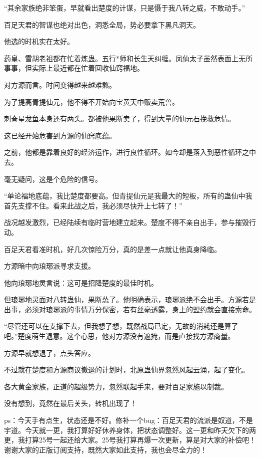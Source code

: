 \begin{this_body}
“其余家族绝非笨蛋，早就看出楚度的计谋，只是慑于我八转之威，不敢动手。”

百足天君的智谋也绝对出色，洞悉全局，势必要拿下黑凡洞天。

他选的时机实在太好。

药皇、雪胡老祖都在忙着炼蛊。五行*师和长生天纠缠。凤仙太子虽然表面上无所事事，但实际上最近都在忙着回收仙窍福地。

对方源而言。时间变得越来越难熬。

为了提高青提仙元，他不得不开始向宝黄天中贩卖荒兽。

刺脊星龙鱼本身还有两头。都被他果断卖了，得到大量的仙元石挽救危情。

这已经开始危害到方源的仙窍底蕴。

之前，他都是靠着良好的经济运作，进行良性循环。如今却是落入到恶性循环之中去。

毫无疑问，这是个危险的信号。

“单论福地底蕴，我比楚度都要高。但青提仙元是我最大的短板，所有的蛊仙中我首先支撑不住。看来此战之后，我必须尽快升上七转了！”

战况越发激烈，已经陆续有临时营地建立起来。楚度不得不亲自出手，参与摧毁行动。

百足天君看准时机，好几次惊险万分，真的是差一点就让他真身降临。

方源暗中向琅琊派寻求支援。

他向琅琊地灵言说：这可是招降楚度的最佳时机。

但琅琊地灵面对八转蛊仙，果断怂了。他明确表示，琅琊派绝不会出手。方源若是出事，必须对琅琊派的事情万分保密，若有丝毫透露，身上的盟约就会直接索命。

“尽管还可以在支撑下去，但我想了想，既然战局已定，无故的消耗还是算了吧。”楚度萌生退意。这个心思，他对方源没有遮掩，而是直接找方源商量。

方源早就想退了，点头答应。

不过就在楚度和方源商议撤退的计划时，北原蛊仙界忽然风起云涌，起了变化。

各大黄金家族，正道的超级势力，忽然联起手来，要对百足家施以制裁。

没有想到，竟然在最后关头，转机出现了！

ps：今天手有点生，状态还是不好。修补一个bug：百足天君的流派是奴道，不是宇道。今天就一更，我打算好好休养身体，把状态调整好。这一更和昨天欠下的两更，我打算25号一起还给大家。25号我打算再爆一次更新，算是对大家的补偿吧！谢谢大家的正版订阅支持，既然大家如此支持，我也会尽全力的！

\end{this_body}

